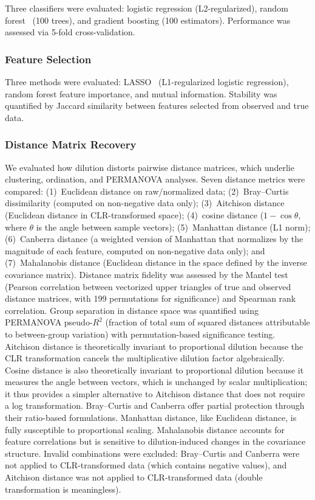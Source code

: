 \documentclass[12pt]{article}
\begin{document}
Three classifiers were evaluated: logistic regression (L2-regularized), random forest~\cite{Breiman2001} (100 trees), and gradient boosting (100 estimators). Performance was assessed via 5-fold cross-validation.

\subsubsection{Feature Selection}

Three methods were evaluated: LASSO~\cite{Tibshirani1996} (L1-regularized logistic regression), random forest feature importance, and mutual information. Stability was quantified by Jaccard similarity between features selected from observed and true data.

\subsubsection{Distance Matrix Recovery}

We evaluated how dilution distorts pairwise distance matrices, which underlie clustering, ordination, and PERMANOVA analyses. Seven distance metrics were compared: (1)~Euclidean distance on raw/normalized data; (2)~Bray--Curtis dissimilarity (computed on non-negative data only); (3)~Aitchison distance (Euclidean distance in CLR-transformed space); (4)~cosine distance ($1 - \cos\theta$, where $\theta$ is the angle between sample vectors); (5)~Manhattan distance (L1 norm); (6)~Canberra distance (a weighted version of Manhattan that normalizes by the magnitude of each feature, computed on non-negative data only); and (7)~Mahalanobis distance (Euclidean distance in the space defined by the inverse covariance matrix). Distance matrix fidelity was assessed by the Mantel test (Pearson correlation between vectorized upper triangles of true and observed distance matrices, with 199 permutations for significance) and Spearman rank correlation. Group separation in distance space was quantified using PERMANOVA pseudo-$R^2$ (fraction of total sum of squared distances attributable to between-group variation) with permutation-based significance testing. Aitchison distance is theoretically invariant to proportional dilution because the CLR transformation cancels the multiplicative dilution factor algebraically. Cosine distance is also theoretically invariant to proportional dilution because it measures the angle between vectors, which is unchanged by scalar multiplication; it thus provides a simpler alternative to Aitchison distance that does not require a log transformation. Bray--Curtis and Canberra offer partial protection through their ratio-based formulations. Manhattan distance, like Euclidean distance, is fully susceptible to proportional scaling. Mahalanobis distance accounts for feature correlations but is sensitive to dilution-induced changes in the covariance structure. Invalid combinations were excluded: Bray--Curtis and Canberra were not applied to CLR-transformed data (which contains negative values), and Aitchison distance was not applied to CLR-transformed data (double transformation is meaningless).
\end{document}
